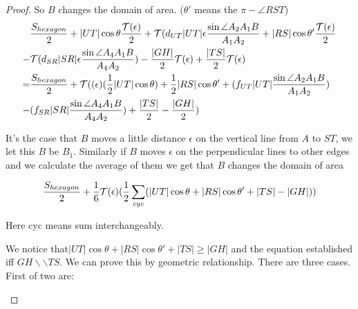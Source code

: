 \begin{proof}
	So $B$ changes the domain of area.
	($\theta'$ means the $\pi - \angle RST$)
	\begin{equation}
	\begin{split}
	&\frac{S_{hexagon}}{2} + |UT|\cos\theta \frac{\T(\epsilon)}{2} + \T(d_{UT}|UT|\epsilon\frac{\sin \angle A_2A_1B}{A_1A_2} + 
	|RS|\cos\theta' \frac{\T(\epsilon)}{2}\\
	-& \T(d_{SR}|SR|\epsilon\frac{\sin \angle A_4A_1B}{A_4A_2}) - \frac{|GH|}{2}\T(\epsilon) + 
	\frac{|TS|}{2}\T(\epsilon)
	\\
	= & \frac{S_{hexagon}}{2} + \T((\epsilon)
	(\frac{1}{2}|UT|\cos\theta )
	+\frac{1}{2}|RS|\cos\theta' +(f_{UT}|UT|\frac{\sin 
		\angle A_2A_1B}{A_1A_2})\\
	- &(f_{SR}|SR|\frac{\sin \angle A_4A_1B}{A_4A_2}) + 
	\frac{|TS|}{2} - \frac{|GH|}{2})
	\end{split}
	\end{equation}
	
	It's the case that $B$ moves a little distance $\epsilon$ 
	on the vertical line from $A$ to $ST$, we let this $B$ be $B_1$. 
	Similarly if $B$ moves $\epsilon$ on the perpendicular lines to 
	other edges and we calculate the average of them we get that $B$ 
	changes the domain of area 
	
	\[ \frac{S_{hexagon}}{2} + \frac{1}{6} \T(\epsilon)(\frac{1}{2}\sum _{cyc}(|UT|\cos\theta+|RS|\cos\theta'+|TS|-|GH|)) \]
	
	Here cyc means sum interchangeably.
	
	We notice that$|UT|\cos\theta + |RS|\cos\theta' + |TS|\geq|GH|$ 
	and the equation established iff $GH \backslash \backslash TS$. 
	We can prove this by geometric relationship. There are three cases.
	First of two are:
	
	\begin{center}
		\begin{tikzpicture}[scale=0.6]
		

\end{tikzpicture}
\end{center}
\end{proof}
